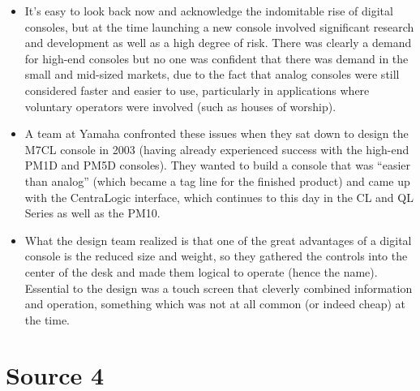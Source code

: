 \documentclass[12pt]{article}
\begin{document}
\begin{itemize}
            \item It's easy to look back now and acknowledge the indomitable rise of digital consoles, but at the time launching a new console involved significant research and development as well as a high degree of risk. There was clearly a demand for high-end consoles but no one was confident that there was demand in the small and mid-sized markets, due to the fact that analog consoles were still considered faster and easier to use, particularly in applications where voluntary operators were involved (such as houses of worship).
            \item A team at Yamaha confronted these issues when they sat down to design the M7CL console in 2003 (having already experienced success with the high-end PM1D and PM5D consoles). They wanted to build a console that was “easier than analog” (which became a tag line for the finished product) and came up with the CentraLogic interface, which continues to this day in the CL and QL Series as well as the PM10.
            \item What the design team realized is that one of the great advantages of a digital console is the reduced size and weight, so they gathered the controls into the center of the desk and made them logical to operate (hence the name). Essential to the design was a touch screen that cleverly combined information and operation, something which was not at all common (or indeed cheap) at the time.            
        \end{itemize}
        \newpage{}
    \section{Source 4 \cite{coulesHistoryLiveSound2021}}
\end{document}
